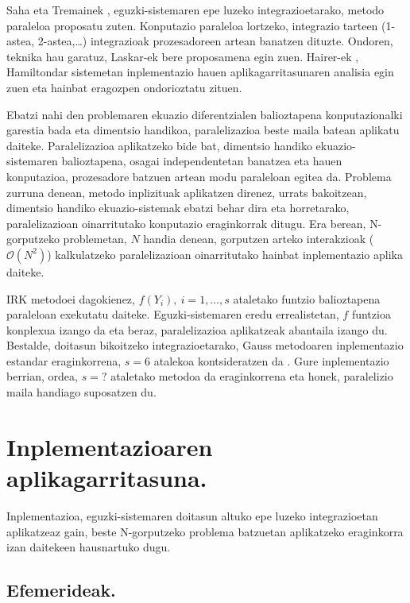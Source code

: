 Saha eta Tremainek \cite{Saha1996}, eguzki-sistemaren epe luzeko integrazioetarako, metodo paraleloa proposatu zuten. Konputazio paraleloa lortzeko, integrazio tarteen (1-astea, 2-astea,\dots) integrazioak prozesadoreen artean banatzen dituzte. Ondoren, teknika hau garatuz, Laskar-ek \cite{Jimenez-Perez2011} bere proposamena egin zuen. Hairer-ek \cite{Gander2014}, Hamiltondar sistemetan inplementazio hauen  aplikagarritasunaren analisia egin zuen eta hainbat eragozpen ondorioztatu zituen.

Ebatzi nahi den problemaren ekuazio diferentzialen balioztapena konputazionalki garestia bada eta dimentsio handikoa, paralelizazioa beste maila batean aplikatu daiteke. Paralelizazioa aplikatzeko bide bat, dimentsio handiko ekuazio-sistemaren balioztapena, osagai independentetan banatzea eta hauen konputazioa, prozesadore batzuen artean modu paraleloan egitea da. Problema zurruna denean, metodo inplizituak aplikatzen direnez, urrats bakoitzean, dimentsio handiko ekuazio-sistemak ebatzi behar dira eta horretarako, paralelizazioan oinarritutako konputazio eraginkorrak ditugu. Era berean, N-gorputzeko problemetan, $N$ handia denean, gorputzen arteko interakzioak ($\mathcal{O}(N^2)$) kalkulatzeko         
paralelizazioan oinarritutako hainbat inplementazio \cite{Barnes1986,Carrier1988,Driscoll2013} aplika daiteke. 

IRK metodoei dagokienez, $f(Y_i), \ i=1,\dots,s$ ataletako funtzio balioztapena paraleloan exekutatu daiteke. Eguzki-sistemaren eredu errealistetan, $f$ funtzioa konplexua izango da eta beraz, paralelizazioa aplikatzeak abantaila izango du. Bestalde, doitasun bikoitzeko integrazioetarako, Gauss metodoaren inplementazio estandar eraginkorrena, $s=6$ atalekoa kontsideratzen da \cite{Hairer2006}. Gure inplementazio berrian, ordea, $s=?$ ataletako metodoa da eraginkorrena eta honek, paralelizio maila handiago suposatzen du.    


\section{Inplementazioaren aplikagarritasuna.}


Inplementazioa, eguzki-sistemaren doitasun altuko epe luzeko integrazioetan aplikatzeaz gain, beste N-gorputzeko problema batzuetan aplikatzeko eraginkorra izan daitekeen hausnartuko dugu. 

\subsection*{Efemerideak.}

